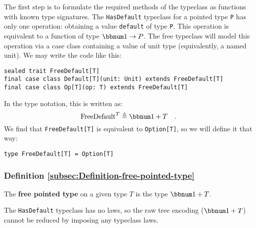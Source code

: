 The first step is to formulate the required methods of the typeclass
as functions with known type signatures. The \lstinline!HasDefault!
typeclass for a pointed type \lstinline!P!
has only one operation: obtaining a value \lstinline!default!
of type \lstinline!P!.
This operation is equivalent to a function of type $\bbnum 1\rightarrow P$.
The free typeclass will model this operation via a case class containing
a value of unit type (equivalently, a named unit). We may write the
code like this:
\begin{lstlisting}
sealed trait FreeDefault[T]
final case class Default[T](unit: Unit) extends FreeDefault[T]
final case class Op[T](op: T) extends FreeDefault[T]
\end{lstlisting}
In the type notation, this is written as:
\[
\text{FreeDefault}^{T}\triangleq\bbnum 1+T\quad.
\]
 We find that \lstinline!FreeDefault[T]!
is equivalent to \lstinline!Option[T]!,
so we will define it that way:
\begin{lstlisting}
type FreeDefault[T] = Option[T]
\end{lstlisting}

\subsubsection{Definition \label{subsec:Definition-free-pointed-type}\ref{subsec:Definition-free-pointed-type}}

The \textbf{free pointed type} on a given
type $T$ is the type $\bbnum 1+T$.

The \lstinline!HasDefault!
typeclass has no laws, so the raw tree encoding ($\bbnum 1+T$) cannot
be reduced by imposing any typeclass laws. 

